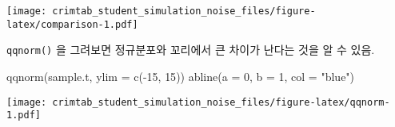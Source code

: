 \documentclass[
]{article}
\newenvironment{Shaded}{\begin{snugshade}}{\end{snugshade}}
\newcommand{\AttributeTok}[1]{\textcolor[rgb]{0.77,0.63,0.00}{#1}}
\newcommand{\DecValTok}[1]{\textcolor[rgb]{0.00,0.00,0.81}{#1}}
\newcommand{\FunctionTok}[1]{\textcolor[rgb]{0.00,0.00,0.00}{#1}}
\newcommand{\NormalTok}[1]{#1}
\newcommand{\SpecialCharTok}[1]{\textcolor[rgb]{0.00,0.00,0.00}{#1}}
\newcommand{\StringTok}[1]{\textcolor[rgb]{0.31,0.60,0.02}{#1}}
\begin{document}
\texttt{[image: crimtab\_student\_simulation\_noise\_files/figure-latex/comparison-1.pdf]}

\texttt{qqnorm()} 을 그려보면 정규분포와 꼬리에서 큰 차이가 난다는 것을
알 수 있음.

\begin{Shaded}
\begin{Highlighting}[]
\FunctionTok{qqnorm}\NormalTok{(sample.t, }\AttributeTok{ylim =} \FunctionTok{c}\NormalTok{(}\SpecialCharTok{{-}}\DecValTok{15}\NormalTok{, }\DecValTok{15}\NormalTok{))}
\FunctionTok{abline}\NormalTok{(}\AttributeTok{a =} \DecValTok{0}\NormalTok{, }\AttributeTok{b =} \DecValTok{1}\NormalTok{, }\AttributeTok{col =} \StringTok{"blue"}\NormalTok{)}
\end{Highlighting}
\end{Shaded}

\texttt{[image: crimtab\_student\_simulation\_noise\_files/figure-latex/qqnorm-1.pdf]}
\end{document}
